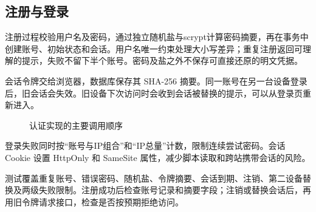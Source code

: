 \subsection*{注册与登录}
注册过程校验用户名及密码，通过独立随机盐与scrypt计算密码摘要，再在事务中创建账号、初始状态和会话。用户名唯一约束处理大小写差异；重复注册返回可理解的提示，失败不留下半个账号。密码及盐之外不保存可直接还原的明文凭据。

会话令牌交给浏览器，数据库保存其 SHA-256 摘要。同一账号在另一台设备登录后，旧会话会失效。旧设备下次访问时会收到会话被替换的提示，可以从登录页重新进入。

\begin{figure}[H]\centering
{}\caption{认证实现的主要调用顺序}\end{figure}

登录失败同时按“账号与IP组合”和“IP总量”计数，限制连续尝试密码。会话 Cookie 设置 HttpOnly 和 SameSite 属性，减少脚本读取和跨站携带会话的风险。

测试覆盖重复账号、错误密码、随机盐、令牌摘要、会话到期、注销、第二设备替换及两级失败限制。注册成功后检查账号记录和摘要字段；注销或替换会话后，再用旧令牌请求接口，检查是否按预期拒绝访问。
